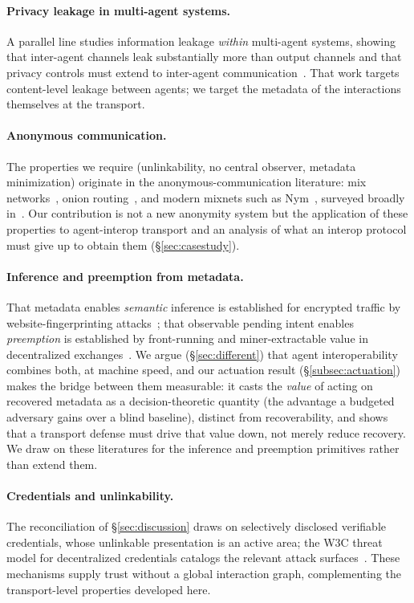 \documentclass[10pt,twocolumn]{article}
\theoremstyle{definition}
\begin{document}
\paragraph{Privacy leakage in multi-agent systems.}
A parallel line studies information leakage \emph{within} multi-agent systems,
showing that inter-agent channels leak substantially more than output channels and
that privacy controls must extend to inter-agent
communication~\citep{agentleak2026, mas2025}. That work targets content-level
leakage between agents; we target the metadata of the interactions themselves at
the transport.

\paragraph{Anonymous communication.}
The properties we require (unlinkability, no central observer, metadata
minimization) originate in the anonymous-communication literature: mix
networks~\citep{chaum1981mix}, onion routing~\citep{tor}, and modern mixnets such as
Nym~\citep{nym}, surveyed broadly in~\citep{anoncomm}. Our contribution is not a new
anonymity system but the application of these properties to agent-interop transport
and an analysis of what an interop protocol must give up to obtain them
(\S\ref{sec:casestudy}).

\paragraph{Inference and preemption from metadata.}
That metadata enables \emph{semantic} inference is established for encrypted traffic
by website-fingerprinting attacks~\citep{wfp}; that observable pending intent enables
\emph{preemption} is established by front-running and miner-extractable value in
decentralized exchanges~\citep{flashboys}. We argue (\S\ref{sec:different}) that
agent interoperability combines both, at machine speed, and our actuation result
(\S\ref{subsec:actuation}) makes the bridge between them measurable: it casts the
\emph{value} of acting on recovered metadata as a decision-theoretic quantity (the
advantage a budgeted adversary gains over a blind baseline), distinct from
recoverability, and shows that a transport defense must drive that value down, not
merely reduce recovery. We draw on these literatures for the inference and preemption
primitives rather than extend them.

\paragraph{Credentials and unlinkability.}
The reconciliation of \S\ref{sec:discussion} draws on selectively disclosed
verifiable credentials, whose unlinkable presentation is an active area; the W3C
threat model for decentralized credentials catalogs the relevant attack
surfaces~\citep{w3ccred}. These mechanisms supply trust without a global interaction
graph, complementing the transport-level properties developed here.
\end{document}
